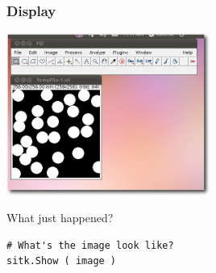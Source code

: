 \begin{frame}[fragile]
\frametitle{Display}
\begin{center}
  \includegraphics[width=0.5\textwidth]{Images/ImageDisplay_shadow}
\end{center}

What just happened?
\lstpython
\begin{lstlisting}
# What's the image look like?
sitk.Show ( image )
\end{lstlisting}
\end{frame}


